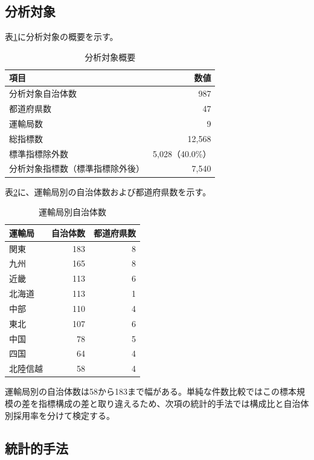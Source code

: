 \subsection{分析対象}

表\ref{tab:analysis_target}に分析対象の概要を示す。

\begin{table}[htbp]
\caption{分析対象概要}
\label{tab:analysis_target}
\centering
\begin{tabular}{lr}
\toprule
項目 & 数値 \\
\midrule
分析対象自治体数 & 987 \\
都道府県数 & 47 \\
運輸局数 & 9 \\
総指標数 & 12,568 \\
標準指標除外数 & 5,028（40.0\%） \\
分析対象指標数（標準指標除外後） & 7,540 \\
\bottomrule
\end{tabular}
\end{table}

表\ref{tab:bureau_counts}に、運輸局別の自治体数および都道府県数を示す。

\begin{table}[htbp]
\caption{運輸局別自治体数}
\label{tab:bureau_counts}
\centering
\begin{tabular}{lrr}
\toprule
運輸局 & 自治体数 & 都道府県数 \\
\midrule
関東 & 183 & 8 \\
九州 & 165 & 8 \\
近畿 & 113 & 6 \\
北海道 & 113 & 1 \\
中部 & 110 & 4 \\
東北 & 107 & 6 \\
中国 & 78 & 5 \\
四国 & 64 & 4 \\
北陸信越 & 58 & 4 \\
\bottomrule
\end{tabular}
\end{table}

運輸局別の自治体数は58から183まで幅がある。単純な件数比較ではこの標本規模の差を指標構成の差と取り違えるため、次項の統計的手法では構成比と自治体別採用率を分けて検定する。

\subsection{統計的手法}

